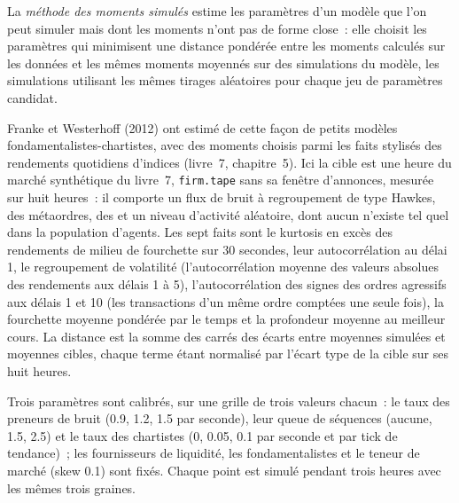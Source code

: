 \begin{definition}\label{def:mx:build-an-agent-based-market:msm}
La \emph{méthode des moments simulés} estime les paramètres d'un modèle que l'on peut simuler mais dont les moments
n'ont pas de forme close~: elle choisit les paramètres qui minimisent une distance pondérée entre les moments calculés sur les données et les mêmes moments moyennés
sur des simulations du modèle, les simulations utilisant les mêmes tirages aléatoires pour chaque jeu de paramètres candidat.
\end{definition}

Franke et Westerhoff (2012) ont estimé de cette façon de petits modèles fondamentalistes-chartistes, avec des moments choisis parmi les faits stylisés
des rendements quotidiens d'indices (livre~7, chapitre~5). Ici la cible est une heure du marché synthétique du livre~7, \texttt{firm.tape} sans sa fenêtre d'annonces, mesurée sur huit heures~:
il comporte un flux de bruit à regroupement de type Hawkes, des métaordres, des  et un niveau d'activité aléatoire, dont aucun n'existe tel quel dans la population d'agents. Les
sept faits sont le kurtosis en excès des rendements de milieu de fourchette sur 30 secondes, leur autocorrélation au délai 1, le regroupement de volatilité (l'autocorrélation moyenne des
valeurs absolues des rendements aux délais 1 à 5), l'autocorrélation des signes des ordres agressifs aux délais 1 et 10 (les transactions d'un même ordre comptées une seule fois), la
fourchette moyenne pondérée par le temps et la profondeur moyenne au meilleur cours. La distance est la somme des carrés des écarts entre moyennes simulées et moyennes cibles, chaque terme
étant normalisé par l'écart type de la cible sur ses huit heures.

\label{lst:mx:build-an-agent-based-market:msm}

Trois paramètres sont calibrés, sur une grille de trois valeurs chacun~: le taux des preneurs de bruit (0.9, 1.2, 1.5 par seconde), leur queue de séquences (aucune, 1.5, 2.5) et
le taux des chartistes (0, 0.05, 0.1 par seconde et par tick de tendance)~; les fournisseurs de liquidité, les fondamentalistes et le teneur de marché (skew 0.1) sont fixés. Chaque point est simulé
pendant trois heures avec les mêmes trois graines.


